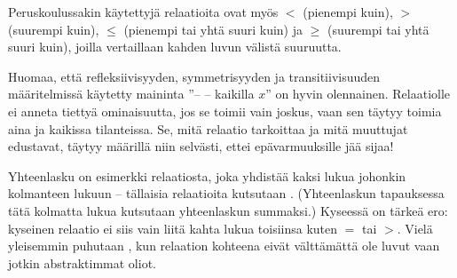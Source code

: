 Peruskoulussakin käytettyjä relaatioita ovat myös $<$ (pienempi kuin), $>$ (suurempi kuin), $\leq$ (pienempi tai yhtä suuri kuin) ja $\geq$ (suurempi tai yhtä suuri kuin), joilla vertaillaan kahden luvun välistä suuruutta.

\begin{esimerkki}
\end{esimerkki}

Huomaa, että refleksiivisyyden, symmetrisyyden ja transitiivisuuden määritelmissä käytetty maininta ''-- -- kaikilla $x$'' on hyvin olennainen. Relaatiolle ei anneta tiettyä ominaisuutta, jos se toimii vain joskus, vaan sen täytyy toimia aina ja kaikissa tilanteissa. Se, mitä relaatio tarkoittaa ja mitä muuttujat edustavat, täytyy määrillä niin selvästi, ettei epävarmuuksille jää sijaa!

Yhteenlasku on esimerkki relaatiosta, joka yhdistää kaksi lukua johonkin kolmanteen lukuun -- tällaisia relaatioita kutsutaan . (Yhteenlaskun tapauksessa tätä kolmatta lukua kutsutaan yhteenlaskun summaksi.) Kyseessä on tärkeä ero: kyseinen relaatio ei siis vain liitä kahta lukua toisiinsa kuten $=$ tai $>$. Vielä yleisemmin puhutaan , kun relaation kohteena eivät välttämättä ole luvut vaan jotkin abstraktimmat oliot.
